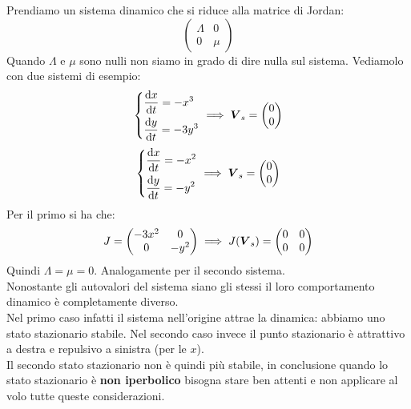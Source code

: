 \begin{exmp}
    Prendiamo un sistema dinamico che si riduce alla matrice di Jordan:
    \[
	\begin{pmatrix} \Lambda  & 0 \\ 0 & \mu \end{pmatrix} 
    \] 
    Quando $\Lambda$ e $\mu$ sono nulli non siamo in grado di dire nulla sul sistema. Vediamolo con due sistemi di esempio:
    \[\begin{dcases}
        \frac{\text{d} x}{\text{d} t} = -x^3\\
	\frac{\text{d} y}{\text{d} t} = -3y^3
    \end{dcases}\implies\boldsymbol{V}_s = \begin{pmatrix} 0 \\ 0 \end{pmatrix} \] 
    \[\begin{dcases}
        \frac{\text{d} x}{\text{d} t} = - x^2\\
	\frac{\text{d} y}{\text{d} t} = - y^2
    \end{dcases}\implies\boldsymbol{V}_s = \begin{pmatrix} 0 \\ 0 \end{pmatrix}\] 
    Per il primo si ha che:
    \[
	J = \begin{pmatrix} -3x^2 & 0 \\ 0 & - y^2 \end{pmatrix} \implies  J(\boldsymbol{V}_s) = \begin{pmatrix} 0 & 0 \\ 0 & 0 \end{pmatrix} 
    \] 
    Quindi $\Lambda  = \mu  = 0$. Analogamente per il secondo sistema.\\
    Nonostante gli autovalori del sistema siano gli stessi il loro comportamento dinamico è completamente diverso.\\
    Nel primo caso infatti il sistema nell'origine attrae la dinamica: abbiamo uno stato stazionario stabile. Nel secondo caso invece il punto stazionario è attrattivo a destra e repulsivo a sinistra (per le $x$).\\
    Il secondo stato stazionario non è quindi più stabile, in conclusione quando lo stato stazionario è \textbf{non iperbolico} bisogna stare ben attenti e non applicare al volo tutte queste considerazioni.
\end{exmp}
\noindent

